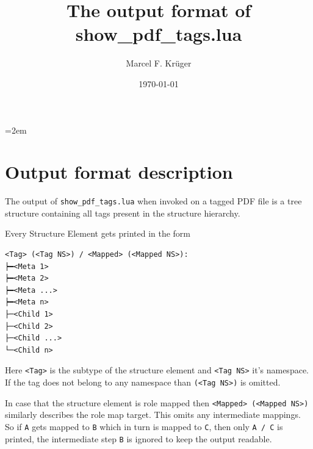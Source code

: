 \documentclass[a4paper]{article}
\title{The output format of show\_pdf\_tags.lua}
\author{Marcel F. Krüger}
\date{\today}
\begin{document}
\emergencystretch=2em
\maketitle
\section{Output format description}
The output of \texttt{show\_pdf\_tags.lua} when invoked on a tagged PDF file is a tree structure containing all tags present in the structure hierarchy.

Every Structure Element gets printed in the form
\begin{verbatim}
<Tag> (<Tag NS>) / <Mapped> (<Mapped NS>):
┝━<Meta 1>
┝━<Meta 2>
┝━<Meta ...>
┝━<Meta n>
├─<Child 1>
├─<Child 2>
├─<Child ...>
└─<Child n>
\end{verbatim}
Here \texttt{<Tag>} is the subtype of the structure element and \texttt{<Tag NS>} it's namespace.
If the tag does not belong to any namespace than \texttt{(<Tag NS>)} is omitted. 

In case that the structure element is role mapped then \texttt{<Mapped> (<Mapped NS>)} similarly describes the role map target.
This omits any intermediate mappings. So if \texttt{A} gets mapped to \texttt{B} which in turn is mapped to \texttt{C}, then
only \texttt{A / C} is printed, the intermediate step \texttt{B} is ignored to keep the output readable.
\end{document}

